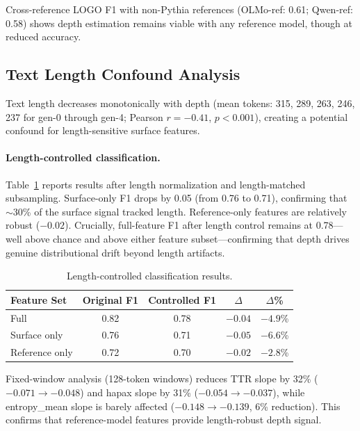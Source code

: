 \documentclass[letterpaper]{article}
\begin{document}
Cross-reference LOGO F1 with non-Pythia references (OLMo-ref: 0.61; Qwen-ref: 0.58) shows depth estimation remains viable with any reference model, though at reduced accuracy.

\subsection{Text Length Confound Analysis}
\label{sec:length}

Text length decreases monotonically with depth (mean tokens: 315, 289, 263, 246, 237 for gen-0 through gen-4; Pearson $r{=}-0.41$, $p{<}0.001$), creating a potential confound for length-sensitive surface features.

\paragraph{Length-controlled classification.}
Table~\ref{tab:length_control} reports results after length normalization and length-matched subsampling.
Surface-only F1 drops by 0.05 (from 0.76 to 0.71), confirming that ${\sim}$30\% of the surface signal tracked length.
Reference-only features are relatively robust ($-0.02$).
Crucially, full-feature F1 after length control remains at 0.78---well above chance and above either feature subset---confirming that depth drives genuine distributional drift beyond length artifacts.

\begin{table}[h]
\centering
\caption{Length-controlled classification results.}
\label{tab:length_control}
\begin{tabular}{lcccc}
\toprule
Feature Set & Original F1 & Controlled F1 & $\Delta$ & $\Delta$\% \\
\midrule
Full & 0.82 & 0.78 & $-0.04$ & $-4.9$\% \\
Surface only & 0.76 & 0.71 & $-0.05$ & $-6.6$\% \\
Reference only & 0.72 & 0.70 & $-0.02$ & $-2.8$\% \\
\bottomrule
\end{tabular}
\end{table}

Fixed-window analysis (128-token windows) reduces TTR slope by 32\% ($-0.071 \to -0.048$) and hapax slope by 31\% ($-0.054 \to -0.037$), while entropy\_mean slope is barely affected ($-0.148 \to -0.139$, 6\% reduction).
This confirms that reference-model features provide length-robust depth signal.
\end{document}

